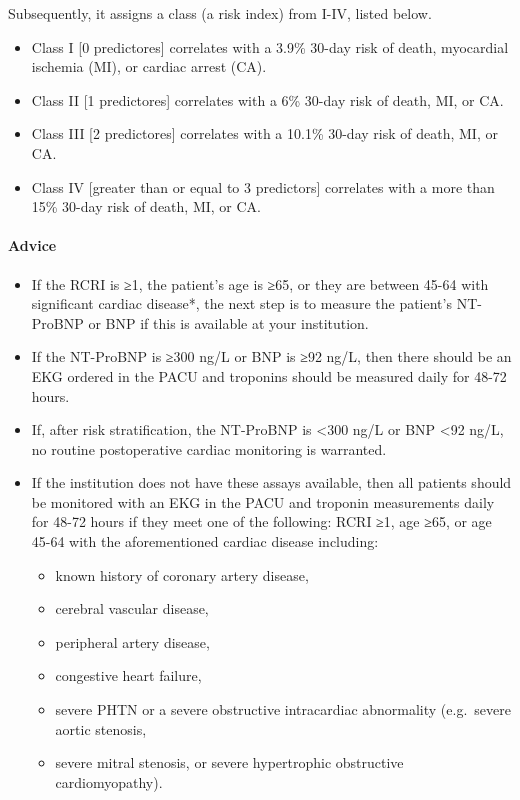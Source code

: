 \documentclass[
  letterpaper,
  DIV=11,
  numbers=noendperiod]{scrreprt}
\let\oldparagraph\paragraph
\renewcommand{\paragraph}[1]{\oldparagraph{#1}\mbox{}}
\providecommand{\tightlist}{%
  \setlength{\itemsep}{0pt}\setlength{\parskip}{0pt}}\usepackage{longtable,booktabs,array}
\begin{document}
Subsequently, it assigns a class (a risk index) from I-IV, listed below.

\begin{itemize}
\tightlist
\item
  Class I {[}0 predictores{]} correlates with a 3.9\% 30-day risk of
  death, myocardial ischemia (MI), or cardiac arrest (CA).
\item
  Class II {[}1 predictores{]} correlates with a 6\% 30-day risk of
  death, MI, or CA.
\item
  Class III {[}2 predictores{]} correlates with a 10.1\% 30-day risk of
  death, MI, or CA.
\item
  Class IV {[}greater than or equal to 3 predictors{]} correlates with a
  more than 15\% 30-day risk of death, MI, or CA.
\end{itemize}

\paragraph{Advice}\label{advice-1}

\begin{itemize}
\item
  If the RCRI is ≥1, the patient's age is ≥65, or they are between 45-64
  with significant cardiac disease*, the next step is to measure the
  patient's NT-ProBNP or BNP if this is available at your institution.
\item
  If the NT-ProBNP is ≥300 ng/L or BNP is ≥92 ng/L, then there should be
  an EKG ordered in the PACU and troponins should be measured daily for
  48-72 hours.
\item
  If, after risk stratification, the NT-ProBNP is \textless300 ng/L or
  BNP \textless92 ng/L, no routine postoperative cardiac monitoring is
  warranted.
\item
  If the institution does not have these assays available, then all
  patients should be monitored with an EKG in the PACU and troponin
  measurements daily for 48-72 hours if they meet one of the following:
  RCRI ≥1, age ≥65, or age 45-64 with the aforementioned cardiac disease
  including:

  \begin{itemize}
  \tightlist
  \item
    known history of coronary artery disease,
  \item
    cerebral vascular disease,
  \item
    peripheral artery disease,
  \item
    congestive heart failure,
  \item
    severe PHTN or a severe obstructive intracardiac abnormality
    (e.g.~severe aortic stenosis,
  \item
    severe mitral stenosis, or severe hypertrophic obstructive
    cardiomyopathy).
  \end{itemize}
\end{itemize}
\end{document}
